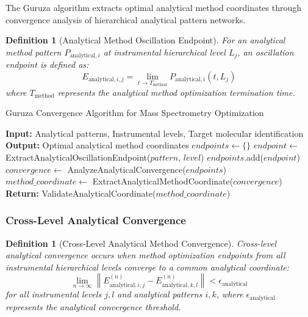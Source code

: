 \documentclass[11pt,a4paper]{article}
\newtheorem{definition}[theorem]{Definition}
\theoremstyle{remark}
\begin{document}
{{{{{{{{{{The Guruza algorithm extracts optimal analytical method coordinates through convergence analysis of hierarchical analytical pattern networks.

\begin{definition}[Analytical Method Oscillation Endpoint]
For an analytical method pattern $P_{\text{analytical},i}$ at instrumental hierarchical level $L_j$, an oscillation endpoint is defined as:
\begin{equation}
E_{\text{analytical},i,j} = \lim_{t \to T_{\text{method}}} P_{\text{analytical},i}(t, L_j)
\end{equation}
where $T_{\text{method}}$ represents the analytical method optimization termination time.
\end{definition}

\begin{algorithm}[H]
\caption{Guruza Convergence Algorithm for Mass Spectrometry Optimization}
\begin{algorithmic}[1]
\State \textbf{Input:} Analytical patterns, Instrumental levels, Target molecular identification
\State \textbf{Output:} Optimal analytical method coordinates
    \State $endpoints \gets \{\}$
            \State $endpoint \gets$ ExtractAnalyticalOscillationEndpoint($pattern$, $level$)
            \State $endpoints$.add($endpoint$)
        \EndFor
    \EndFor
    \State $convergence \gets$ AnalyzeAnalyticalConvergence($endpoints$)
    \State $method\_coordinate \gets$ ExtractAnalyticalMethodCoordinate($convergence$)
    \State \textbf{Return:} ValidateAnalyticalCoordinate($method\_coordinate$)
\EndProcedure
\end{algorithmic}
\end{algorithm}

\subsubsection{Cross-Level Analytical Convergence}

\begin{definition}[Cross-Level Analytical Method Convergence]
Cross-level analytical convergence occurs when method optimization endpoints from all instrumental hierarchical levels converge to a common analytical coordinate:
\begin{equation}
\lim_{n \to \infty} \left\| E_{\text{analytical},i,j}^{(n)} - E_{\text{analytical},k,l}^{(n)} \right\| < \epsilon_{\text{analytical}}
\end{equation}
for all instrumental levels $j, l$ and analytical patterns $i, k$, where $\epsilon_{\text{analytical}}$ represents the analytical convergence threshold.
\end{definition}

}}}}}}}}}}
\end{document}
